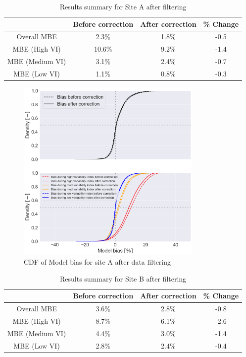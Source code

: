 \documentclass[conference]{IEEEtran}
\begin{document}
\begin{table}[htbp]
\caption{Results summary for Site A after filtering}
\begin{center}
\begin{tabular}{ |c|c|c|c| } 
\hline
& Before correction & After correction & \% Change\\
\hline
Overall MBE & 2.3\% & 1.8\% & -0.5\\
\hline
MBE (High VI) & 10.6\% & 9.2\% & -1.4 \\
\hline
MBE (Medium VI) & 3.1\% & 2.4\% & -0.7\\
\hline
MBE (Low VI) & 1.1\% & 0.8\% & -0.3\\
\hline
\end{tabular}
\end{center}
\label{results_A_after_filter}
\end{table}

\begin{figure}[htbp]
\centerline{\includegraphics[width=9cm]{DCS_ModelBias_breakdown_AFTER_filter_CDF_v3.png}}
\caption{CDF of Model bias for site A after data filtering}
\label{fig:DCS-modelbias-after-filter-cdf}
\end{figure}

\begin{table}[htbp]
\caption{Results summary for Site B after filtering}
\begin{center}
\begin{tabular}{ |c|c|c|c| } 
\hline
& Before correction & After correction & \% Change\\
\hline
Overall MBE & 3.6\% & 2.8\% & -0.8\\
\hline
MBE (High VI) & 8.7\% & 6.1\% & -2.6\\
\hline
MBE (Medium VI) & 4.4\% & 3.0\% & -1.4\\
\hline
MBE (Low VI) & 2.8\% & 2.4\% & -0.4\\
\hline
\end{tabular}
\end{center}
\label{results_A_after_filter}
\end{table}
\end{document}
